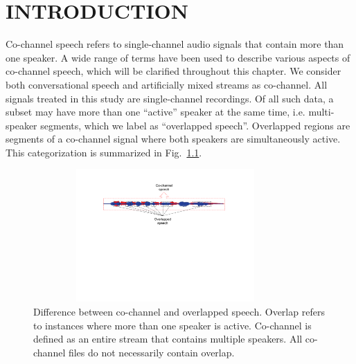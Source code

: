 
\chapter{INTRODUCTION}

Co-channel speech refers to single-channel audio signals that contain more than one speaker. 
A wide range of terms have been used to describe various aspects of co-channel speech, 
which will be clarified throughout this chapter. 
We consider both conversational speech and artificially mixed streams as co-channel. 
All signals treated in this study are single-channel recordings. 
Of all such data, a subset may have more than one ``active'' speaker at the same time, i.e. multi-speaker segments, 
which we label as ``overlapped speech''. 
Overlapped regions are segments of a co-channel signal where both speakers are simultaneously active. This categorization is summarized in Fig.~\ref{fig:cochannel_vs_overlap}.


\begin{figure}[h!]
	\centering
	\vspace{0mm}
	\includegraphics[height = 2in, width=0.9\textwidth]{figures/cochannel_vs_overlap-crop}
	\vspace{-3mm}
	\caption{Difference between co-channel and overlapped speech. Overlap refers to instances where more than one speaker is active. Co-channel is defined as an entire stream that contains multiple speakers. All co-channel files do not necessarily contain overlap. }
	\label{fig:cochannel_vs_overlap}
	\vspace{-3mm}
\end{figure}



